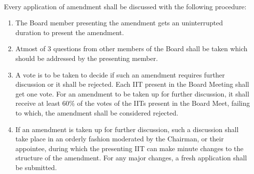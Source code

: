 \paragraph{}
Every application of amendment shall be discussed with the following procedure:
\begin{enumerate}
    \item The Board member presenting the amendment gets an uninterrupted duration to present the amendment.
    \item Atmost of 3 questions from other members of the Board shall be taken which should be addressed by the presenting member.
    \item A vote is to be taken to decide if such an amendment requires further discussion or it shall be rejected. Each IIT present in the Board Meeting shall get one vote. For an amendment to be taken up for further discussion, it shall receive at least 60\% of the votes of the IITs present in the Board Meet, failing to which, the amendment shall be considered rejected.
    \item If an amendment is taken up for further discussion, such a discussion shall take place in an orderly fashion moderated by the Chairman, or their appointee, during which the presenting IIT can make minute changes to the structure of the amendment. For any major changes, a fresh application shall be submitted.
\end{enumerate}

